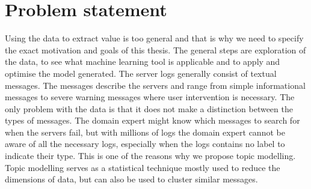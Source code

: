 \begin{comment}
--todo--
The intention of this research started with analysing e system logs to help create a model for predicting hardware and software failure for maintenance and automatic self-healing. The huge amount of system logs available from a variety of systems brought the question how to analyse and make use of the logs to predict hardware and software failure.

Current research of big data makes this a suitable problem to solve through recent machine learning techniques. 
During the time spent on this research challenges were met and identified for realising this goal and ended with the usage of Natural Language Processing (NLP) and unsupervised learning.  The untapped amount of raw data makes it possible for many more application, but in further paragraphs it will be made clear why NLP was chosen and what more could be applied on this Big data problem.

\end{comment}
 
\section{Problem statement}\label{introduction:Motivation}
Using the data to extract value is too general and that is why we need to specify the exact motivation and goals of this thesis. The general steps are exploration of the data, to see what machine learning tool is applicable and to apply and optimise the model generated. The server logs generally consist of textual messages. The messages describe the servers and range from simple informational messages to severe warning messages where user intervention is necessary. The only problem with the data is that it does not make a distinction between the types of messages. The domain expert might know which messages to search for when the servers fail, but with millions of logs the domain expert cannot be aware of all the necessary logs, especially when the logs contains no label to indicate their type. This is one of the reasons why we propose topic modelling. Topic modelling serves as a statistical technique mostly used to reduce the dimensions of data, but can also be used to cluster similar messages.

\begin{comment}

Topic modelling is a hot topic in data science. System logs are used as source for the detection of problems in large computer systems. While domain experts can be used to detect and fix the problems detected, this can be difficult and time consuming. Machine learning techniques like topic modelling make it possible to develop models to extract these latent patterns from these system logs. While topic modelling is normally used in for large text corpera, recent research in the field of short text clustering and twitter tweets clustering are similar enough to by applicable for system logs. An interesting application which has not yet been touched a lot through unsupervised machine learning techniques.

\end{comment}

